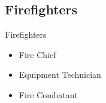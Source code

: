 \subsection{Firefighters}
\begin{frame}{Firefighters}
    \begin{itemize}
        \item Fire Chief
        \item Equipment Technician
        \item Fire Combatant
    \end{itemize}
\end{frame} 